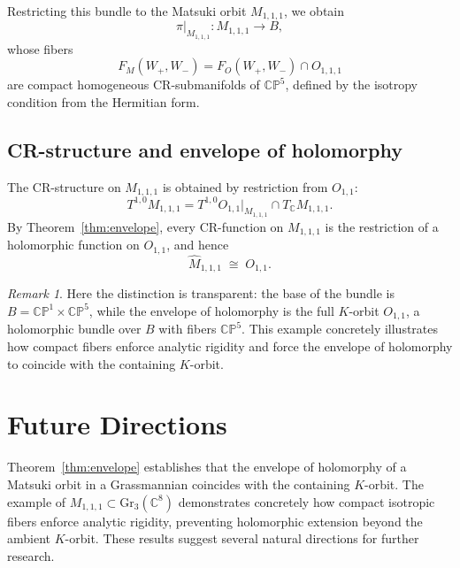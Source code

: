 \documentclass[12pt,a4paper]{article}
\theoremstyle{plain}
\theoremstyle{definition}
\theoremstyle{remark}
\newtheorem*{remark}{Remark}
\begin{document}
Restricting this bundle to the Matsuki orbit $M_{1,1,1}$, we obtain
\[
\pi|_{M_{1,1,1}} : M_{1,1,1} \to B,
\]
whose fibers
\[
F_M(W_+,W_-) = F_O(W_+,W_-) \cap O_{1,1,1}
\]
are compact homogeneous CR-submanifolds of $\mathbb{C}\mathbb{P}^5$, defined 
by the isotropy condition from the Hermitian form. 

\subsection{CR-structure and envelope of holomorphy}
The CR-structure on $M_{1,1,1}$ is obtained by restriction from $O_{1,1}$:
\[
T^{1,0}M_{1,1,1} 
= T^{1,0}O_{1,1}\big|_{M_{1,1,1}} \cap T_{\mathbb{C}}M_{1,1,1}.
\]
By Theorem~\ref{thm:envelope}, every CR-function on $M_{1,1,1}$ is the 
restriction of a holomorphic function on $O_{1,1}$, and hence
\[
\widehat{M}_{1,1,1} \;\cong\; O_{1,1}.
\]

\begin{remark}
Here the distinction is transparent: the base of the bundle is 
$B = \mathbb{C}\mathbb{P}^1 \times \mathbb{C}\mathbb{P}^5$, while the 
envelope of holomorphy is the full $K$-orbit $O_{1,1}$, a holomorphic 
bundle over $B$ with fibers $\mathbb{C}\mathbb{P}^5$. 
This example concretely illustrates how compact fibers enforce analytic 
rigidity and force the envelope of holomorphy to coincide with the 
containing $K$-orbit. 
\end{remark}



\section{Future Directions}

Theorem~\ref{thm:envelope} establishes that the envelope of holomorphy 
of a Matsuki orbit in a Grassmannian coincides with the containing 
$K$-orbit. 
The example of $M_{1,1,1} \subset \mathrm{Gr}_3(\mathbb{C}^8)$ 
demonstrates concretely how compact isotropic fibers enforce analytic rigidity, 
preventing holomorphic extension beyond the ambient $K$-orbit. 
These results suggest several natural directions for further research. 
\end{document}
